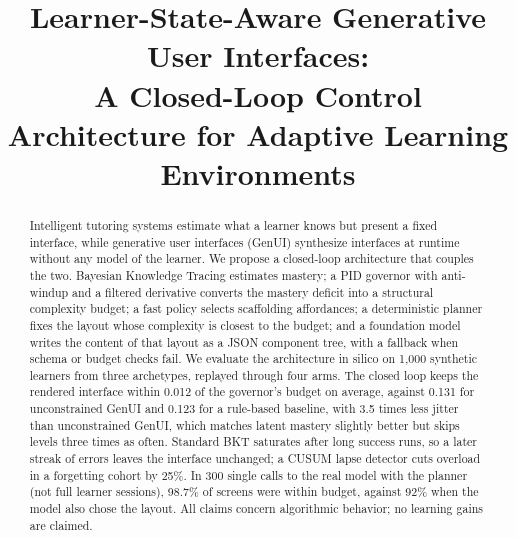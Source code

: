 \documentclass[conference]{IEEEtran}
\begin{document}
\title{Learner-State-Aware Generative User Interfaces:\\
A Closed-Loop Control Architecture for Adaptive Learning Environments}

\author{
}

\maketitle

\begin{abstract}
Intelligent tutoring systems estimate what a learner knows but present a
fixed interface, while generative user interfaces (GenUI) synthesize
interfaces at runtime without any model of the learner. We propose a
closed-loop architecture that couples the two. Bayesian Knowledge Tracing
estimates mastery; a PID governor with anti-windup and a filtered derivative
converts the mastery deficit into a structural complexity budget; a fast
policy selects scaffolding affordances; a deterministic planner fixes the
layout whose complexity is closest to the budget; and a foundation model
writes the content of that layout as a JSON component tree, with a fallback
when schema or budget checks fail. We evaluate the architecture in silico on
1,000 synthetic learners from three archetypes, replayed through four arms.
The closed loop keeps the rendered interface within 0.012 of the governor's
budget on average, against 0.131 for unconstrained GenUI and 0.123 for a
rule-based baseline, with 3.5 times less jitter than unconstrained GenUI,
which matches latent mastery slightly better but skips levels three times as
often. Standard BKT saturates after long success runs, so a later streak of
errors leaves the interface unchanged; a CUSUM lapse detector cuts overload
in a forgetting cohort by 25\%. In 300 single calls to the real model with the
planner (not full learner sessions), 98.7\% of screens were within budget, against 92\% when the model
also chose the layout. All claims concern algorithmic behavior;
no learning gains are claimed.
\end{abstract}
\end{document}
